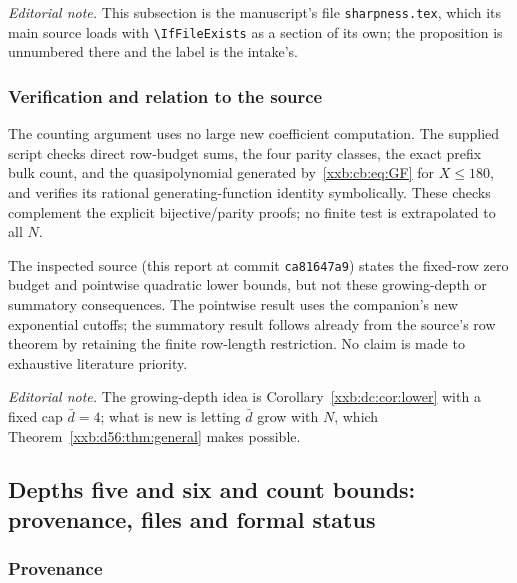 \documentclass[11pt,a4paper]{article}
\numberwithin{equation}{section}
\theoremstyle{definition}
\theoremstyle{remark}
\theoremstyle{plain}
\begin{document}
\emph{Editorial note.}  This subsection is the manuscript's file
\texttt{sharpness.tex}, which its main source loads with
\texttt{\textbackslash IfFileExists} as a section of its own; the
proposition is unnumbered there and the label is the intake's.

\subsubsection{Verification and relation to the source}

The counting argument uses no large new coefficient computation. The supplied
script checks direct row-budget sums, the four parity classes, the exact prefix
bulk count, and the quasipolynomial generated by~\eqref{xxb:cb:eq:GF} for
$X\le180$, and verifies its rational generating-function identity
symbolically. These checks complement the explicit bijective/parity proofs; no
finite test is extrapolated to all $N$.

The inspected source (this report at commit \texttt{ca81647a9}) states the
fixed-row zero budget and pointwise quadratic lower bounds, but not these
growing-depth or summatory consequences. The pointwise result uses the
companion's new exponential cutoffs; the summatory result follows already from
the source's row theorem by retaining the finite row-length restriction. No
claim is made to exhaustive literature priority.

\emph{Editorial note.}  The growing-depth idea is
Corollary~\ref{xxb:dc:cor:lower} with a fixed cap $\bar d=4$; what is new is
letting $\bar d$ grow with $N$, which Theorem~\ref{xxb:d56:thm:general}
makes possible.

\subsection{Depths five and six and count bounds: provenance, files and formal status}\label{xxb:d56:sec:provenance}

\subsubsection{Provenance}
\end{document}
